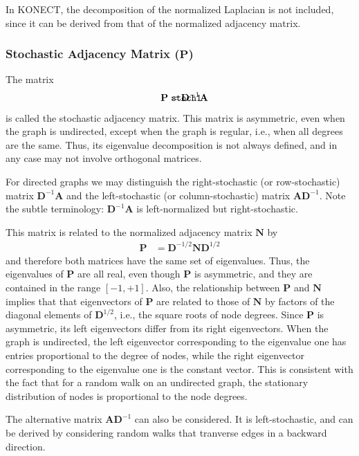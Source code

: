 \documentclass{article}
\def\mathnote#1{%
  \tag*{\rlap{\hspace\marginparsep\smash{\parbox[t]{\marginparwidth}{#1}}}}
}
\begin{document}
In KONECT, the decomposition of the normalized Laplacian is not
included, since it can be derived from that of the normalized adjacency
matrix. 

\subsubsection{Stochastic Adjacency Matrix ($\mathbf P$)}
The matrix
\begin{align*}
  \mathnote{\texttt{stoch1}}
  \mathbf P &= \mathbf D^{-1} \mathbf A
\end{align*}
is called the stochastic adjacency matrix.  This matrix is asymmetric,
even when the graph is undirected, except when the graph is regular,
i.e., when all degrees are the same.  
Thus, its eigenvalue decomposition
is not always defined, and in any case may not involve orthogonal
matrices. 

For directed graphs we may distinguish the right-stochastic (or
row-stochastic) matrix 
$\mathbf D^{-1} \mathbf A$ and the left-stochastic (or column-stochastic)
matrix $\mathbf A \mathbf D^{-1}$.  Note the subtle terminology:
$\mathbf D^{-1} \mathbf A$ is left-normalized but right-stochastic. 

This matrix is related to the normalized adjacency matrix $\mathbf N$ by
\begin{align*}
  \mathbf P &= \mathbf D^{-1/2} \mathbf N \mathbf D^{1/2}
\end{align*}
and therefore both matrices have the same set of eigenvalues.
Thus, the eigenvalues of $\mathbf P$ are all real, even though
$\mathbf P$ is asymmetric, and they are contained in the range $[-1,+1]$. 
Also, the relationship between $\mathbf P$ and $\mathbf N$ implies that that
eigenvectors of $\mathbf P$ are related to those of 
$\mathbf N$ by factors of the diagonal elements of $\mathbf D^{1/2}$,
i.e., the square roots of node degrees. 
Since $\mathbf P$ is asymmetric, its left eigenvectors differ from its
right eigenvectors.  When the graph is undirected, the left eigenvector
corresponding to the eigenvalue one has entries proportional to the
degree of nodes, 
while the right eigenvector corresponding to the eigenvalue one 
is the constant vector.  This is consistent with the fact that for a
random walk on an undirected graph, the stationary distribution of nodes
is proportional to the node degrees. 

The alternative matrix $\mathbf A \mathbf D^{-1}$ can also be
considered.  It is left-stochastic, and
can be derived by considering random walks that tranverse edges in a
backward direction. 
\end{document}
